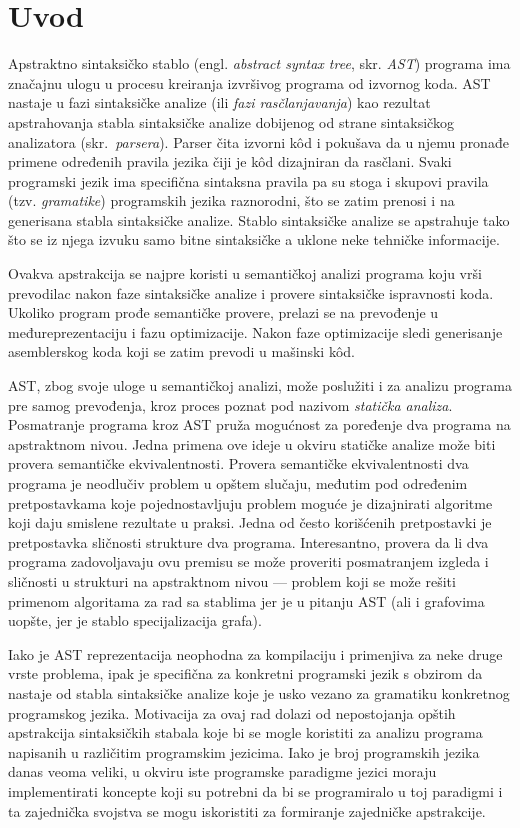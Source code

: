 \chapter{Uvod}
\label{chp:Intro}

Apstraktno sintaksičko stablo (engl. \emph{abstract syntax tree}, skr. \emph{AST}) programa ima značajnu ulogu u procesu kreiranja izvršivog programa od izvornog koda. AST nastaje u fazi sintaksičke analize (ili \emph{fazi rasčlanjavanja}) kao rezultat apstrahovanja stabla sintaksičke analize dobijenog od strane sintaksičkog analizatora (skr.~\emph{parsera}). Parser čita izvorni k\^od i pokušava da u njemu pronađe primene određenih pravila jezika čiji je k\^od dizajniran da rasčlani. Svaki programski jezik ima specifična sintaksna pravila pa su stoga i skupovi pravila (tzv. \emph{gramatike}) programskih jezika raznorodni, što se zatim prenosi i na generisana stabla sintaksičke analize. Stablo sintaksičke analize se apstrahuje tako što se iz njega izvuku samo bitne sintaksičke a uklone neke tehničke informacije.

Ovakva apstrakcija se najpre koristi u semantičkoj analizi programa koju vrši prevodilac nakon faze sintaksičke analize i provere sintaksičke ispravnosti koda. Ukoliko program prođe semantičke provere, prelazi se na prevođenje u međureprezentaciju i fazu optimizacije. Nakon faze optimizacije sledi generisanje asemblerskog koda koji se zatim prevodi u mašinski k\^od.

AST, zbog svoje uloge u semantičkoj analizi, može poslužiti i za analizu programa pre samog prevođenja, kroz proces poznat pod nazivom \emph{statička analiza}. Posmatranje programa kroz AST pruža mogućnost za poređenje dva programa na apstraktnom nivou. Jedna primena ove ideje u okviru statičke analize može biti provera semantičke ekvivalentnosti. Provera semantičke ekvivalentnosti dva programa je neodlučiv problem u opštem slučaju, međutim pod određenim pretpostavkama koje pojednostavljuju problem moguće je dizajnirati algoritme koji daju smislene rezultate u praksi. Jedna od često korišćenih pretpostavki je pretpostavka sličnosti strukture dva programa. Interesantno, provera da li dva programa zadovoljavaju ovu premisu se može proveriti posmatranjem izgleda i sličnosti u strukturi na apstraktnom nivou --- problem koji se može rešiti primenom algoritama za rad sa stablima jer je u pitanju AST (ali i grafovima uopšte, jer je stablo specijalizacija grafa).

Iako je AST reprezentacija neophodna za kompilaciju i primenjiva za neke druge vrste problema, ipak je specifična za konkretni programski jezik s obzirom da nastaje od stabla sintaksičke analize koje je usko vezano za gramatiku konkretnog programskog jezika. Motivacija za ovaj rad dolazi od nepostojanja opštih apstrakcija sintaksičkih stabala koje bi se mogle koristiti za analizu programa napisanih u različitim programskim jezicima. Iako je broj programskih jezika danas veoma veliki, u okviru iste programske paradigme jezici moraju implementirati koncepte koji su potrebni da bi se programiralo u toj paradigmi i ta zajednička svojstva se mogu iskoristiti za formiranje zajedničke apstrakcije. 

